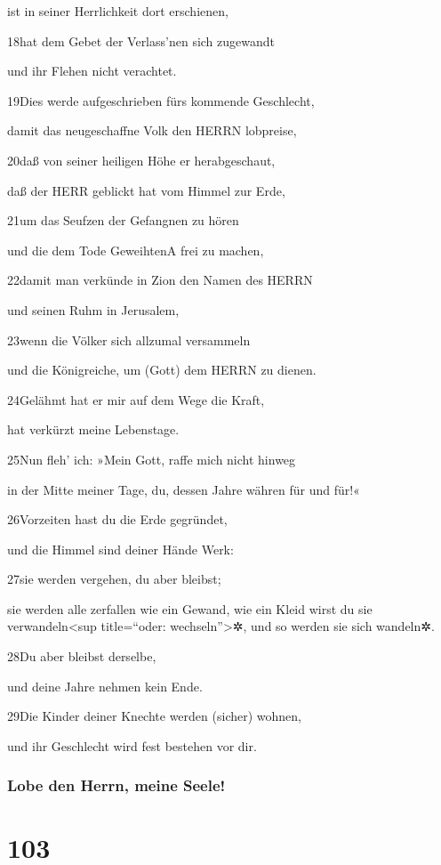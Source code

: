 ist in seiner Herrlichkeit dort erschienen,

18hat dem Gebet der Verlass'nen sich zugewandt

und ihr Flehen nicht verachtet.

19Dies werde aufgeschrieben fürs kommende Geschlecht,

damit das neugeschaffne Volk den HERRN lobpreise,

20daß von seiner heiligen Höhe er herabgeschaut,

daß der HERR geblickt hat vom Himmel zur Erde,

21um das Seufzen der Gefangnen zu hören

und die dem Tode Geweihten{A} frei zu machen,

22damit man verkünde in Zion den Namen des HERRN

und seinen Ruhm in Jerusalem,

23wenn die Völker sich allzumal versammeln

und die Königreiche, um (Gott) dem HERRN zu dienen.

24Gelähmt hat er mir auf dem Wege die Kraft,

hat verkürzt meine Lebenstage.

25Nun fleh' ich: »Mein Gott, raffe mich nicht hinweg

in der Mitte meiner Tage, du, dessen Jahre währen für und für!«

26Vorzeiten hast du die Erde gegründet,

und die Himmel sind deiner Hände Werk:

27sie werden vergehen, du aber bleibst;

sie werden alle zerfallen wie ein Gewand, wie ein Kleid wirst du sie
verwandeln\textless sup title=``oder: wechseln''\textgreater✲, und so
werden sie sich wandeln✲.

28Du aber bleibst derselbe,

und deine Jahre nehmen kein Ende.

29Die Kinder deiner Knechte werden (sicher) wohnen,

und ihr Geschlecht wird fest bestehen vor dir.

\hypertarget{lobe-den-herrn-meine-seele}{%
\subsubsection{Lobe den Herrn, meine
Seele!}\label{lobe-den-herrn-meine-seele}}

\hypertarget{section-102}{%
\section{103}\label{section-102}}

